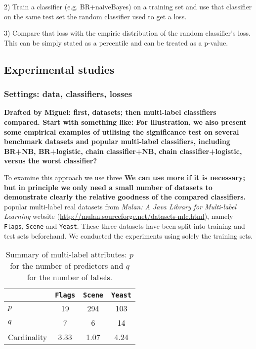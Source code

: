 \documentclass[review]{elsarticle}
\begin{document}
2) Train a classifier (e.g. BR+naiveBayes) on a training set and use that classifier on the same test set the random classifier used to get a loss.

3) Compare that loss with the empiric distribution of the random classifier's loss. This can be simply stated as a percentile and can be treated as a p-value.



\subsection{Experimental studies}\label{ss:experiments}

\subsubsection{Settings: data, classifiers, losses}\label{sss:datasets}

{\bf Drafted by Miguel: first, datasets; then multi-label classifiers compared.  Start with something like: For illustration, we also present some empirical examples of utilising the significance test on several benchmark datasets and popular multi-label classifiers, including BR+NB, BR+logistic, chain classifier+NB, chain classifier+logistic, versus the worst classifier?}

To examine this approach we use three {\bf We can use more if it is necessary; but in principle we only need a small number of datasets to demonstrate clearly the relative goodness of the compared classifiers.} popular multi-label real datasets from \emph{Mulan: A Java Library for Multi-label Learning} website (\url{http://mulan.sourceforge.net/datasets-mlc.html}), namely \texttt{Flags}, \texttt{Scene} and \texttt{Yeast}. These three datasets have been split into training and test sets beforehand. We conducted the experiments using solely the training sets.

\begin{table}[H]
\caption{Summary of multi-label attributes: $p$ for the number of predictors and $q$ for the number of labels.}
\centering
\begin{tabular}{lccc}
  \hline
	  & \texttt{Flags} & \texttt{Scene} & \texttt{Yeast} \\ 
  \hline
 $p$ & 19 & 294 & 103 \\ 
 $q$ & 7 & 6 & 14 \\  
 Cardinality & 3.33 & 1.07 & 4.24\\
    \hline
\end{tabular}
\label{SUMML}
\end{table}
\end{document}
